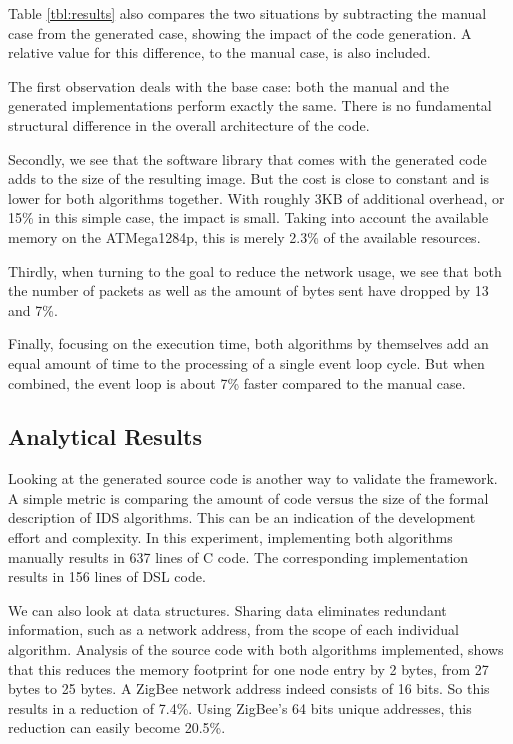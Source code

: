 \documentclass[conference]{IEEEtran}
\begin{document}
Table \ref{tbl:results} also compares the two situations by subtracting the
manual case from the generated case, showing the impact of the code generation.
A relative value for this difference, to the manual case, is also included.

The first observation deals with the base case: both the manual and the
generated implementations perform exactly the same. There is no fundamental
structural difference in the overall architecture of the code.

Secondly, we see that the software library that comes with the generated code
adds to the size of the resulting image. But the cost is close to constant and
is lower for both algorithms together. With roughly 3KB of additional overhead,
or 15\% in this simple case, the impact is small. Taking into account the
available memory on the ATMega1284p, this is merely 2.3\% of the available
resources.

Thirdly, when turning to the goal to reduce the network usage, we see that both
the number of packets as well as the amount of bytes sent have dropped by 13
and 7\%.

Finally, focusing on the execution time, both algorithms by themselves add an
equal amount of time to the processing of a single event loop cycle. But when
combined, the event loop is about 7\% faster compared to the manual case.

\subsection{Analytical Results}

Looking at the generated source code is another way to validate the framework.
A simple metric is comparing the amount of code versus the size of the formal
description of IDS algorithms. This can be an indication of the development
effort and complexity. In this experiment, implementing both algorithms
manually results in 637 lines of C code. The corresponding \NAME implementation
results in 156 lines of DSL code.

We can also look at data structures. Sharing data eliminates redundant
information, such as a network address, from the scope of each individual
algorithm. Analysis of the source code with both algorithms implemented, shows
that this reduces the memory footprint for one node entry by 2 bytes, from 27
bytes to 25 bytes. A ZigBee network address indeed consists of 16 bits. So this
results in a reduction of 7.4\%. Using ZigBee's 64 bits unique addresses, this
reduction can easily become 20.5\%.
\end{document}
